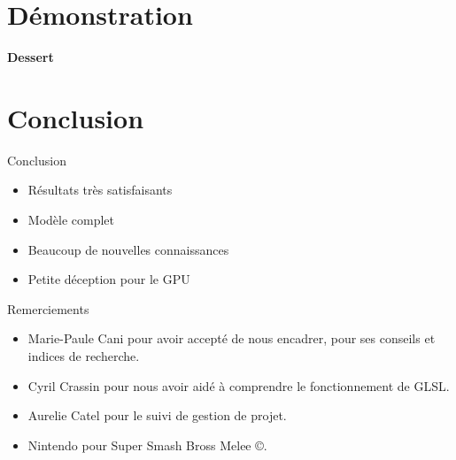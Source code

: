 \documentclass{beamer}
\begin{document}
\section{Démonstration}
\begin{frame}
  \begin{center}
    \textbf{Dessert}
  \end{center}
\end{frame}

\section{Conclusion}
\begin{frame}{Conclusion}
  \begin{itemize}
  \item Résultats très satisfaisants
  \item Modèle complet
  \item Beaucoup de nouvelles connaissances
  \item Petite déception pour le GPU
  \end{itemize}
\end{frame}

\begin{frame}{Remerciements}
  \begin{itemize}
  \item{Marie-Paule Cani} pour avoir accepté de nous encadrer, pour
    ses conseils et indices de recherche.
  \item{Cyril Crassin} pour nous avoir aidé à comprendre le
    fonctionnement de GLSL.
  \item{Aurelie Catel} pour le suivi de gestion de projet.
  \item{Nintendo\texttrademark} pour Super Smash Bross Melee ©.
  \end{itemize}
\end{frame}
\end{document}

